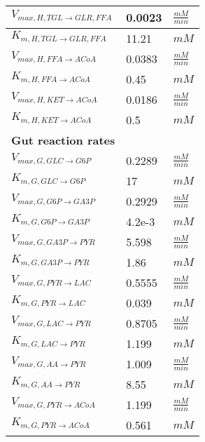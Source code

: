 \begin{supertabular}{lll}
$V_{max, H,TGL \xrightarrow[]{} GLR , FFA}$ & 0.0023 & $\frac{mM}{min}$       \\ \hline
$K_{m, H,TGL \xrightarrow[]{} GLR , FFA}$ & 11.21 & $mM$   \\ \hline

$V_{max, H,FFA \xrightarrow[]{} ACoA}$ & 0.0383 & $\frac{mM}{min}$       \\ \hline
$K_{m, H,FFA \xrightarrow[]{} ACoA}$ & 0.45 & $mM$   \\ \hline

$V_{max, H,KET \xrightarrow[]{} ACoA}$ & 0.0186 & $\frac{mM}{min}$       \\ \hline
$K_{m, H,KET \xrightarrow[]{} ACoA}$ & 0.5 & $mM$   \\ \hline

\textbf{Gut reaction rates} \\ \hline
$V_{max, G,GLC \xrightarrow[]{} G6P}$ & 0.2289 & $\frac{mM}{min}$       \\ \hline
$K_{m, G,GLC \xrightarrow[]{} G6P}$ & 17 & $mM$   \\ \hline

$V_{max, G,G6P \xrightarrow[]{} GA3P}$ & 0.2929 & $\frac{mM}{min}$       \\ \hline
$K_{m, G,G6P \xrightarrow[]{} GA3P}$ & 4.2e-3 & $mM$   \\ \hline

$V_{max, G,GA3P \xrightarrow[]{} PYR}$ & 5.598 & $\frac{mM}{min}$       \\ \hline
$K_{m, G,GA3P \xrightarrow[]{} PYR}$ & 1.86 & $mM$   \\ \hline

$V_{max, G,PYR \xrightarrow[]{} LAC}$ & 0.5555 & $\frac{mM}{min}$       \\ \hline
$K_{m, G,PYR \xrightarrow[]{} LAC}$ & 0.039 & $mM$   \\ \hline

$V_{max, G,LAC \xrightarrow[]{} PYR}$ & 0.8705 & $\frac{mM}{min}$       \\ \hline
$K_{m, G,LAC \xrightarrow[]{} PYR}$ & 1.199 & $mM$   \\ \hline

$V_{max, G,AA \xrightarrow[]{} PYR}$ & 1.009 & $\frac{mM}{min}$       \\ \hline
$K_{m, G,AA \xrightarrow[]{} PYR}$ & 8.55 & $mM$   \\ \hline

$V_{max, G,PYR \xrightarrow[]{} ACoA}$ & 1.199 & $\frac{mM}{min}$       \\ \hline
$K_{m, G,PYR \xrightarrow[]{} ACoA}$ & 0.561 & $mM$   \\ \hline


\end{supertabular}
